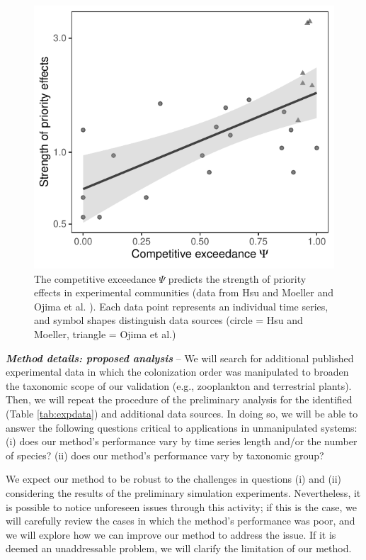 \documentclass[12pt, class=article, crop=false]{standalone}
\begin{document}
\begin{figure}
    \includegraphics[scale=0.7]{output/figure_exp.pdf}
    \caption{The competitive exceedance $\Psi$ predicts the strength of priority effects in experimental communities (data from Hsu and Moeller \citep{hsu_metabolic_2021} and Ojima et al. \citep{ojima_priority_2022}).
    Each data point represents an individual time series, and symbol shapes distinguish data sources (circle = Hsu and Moeller, triangle = Ojima et al.)}
    \label{fig:experiment}
\end{figure}

\textit{\textbf{Method details: proposed analysis}} --
We will search for additional published experimental data in which the colonization order was manipulated to broaden the taxonomic scope of our validation (e.g., zooplankton and terrestrial plants).
Then, we will repeat the procedure of the preliminary analysis for the identified (Table \ref{tab:expdata}) and additional data sources. 
In doing so, we will be able to answer the following questions critical to applications in unmanipulated systems: (i) does our method's performance vary by time series length and/or the number of species? (ii) does our method's performance vary by taxonomic group?

We expect our method to be robust to the challenges in questions (i) and (ii) considering the results of the preliminary simulation experiments.
Nevertheless, it is possible to notice unforeseen issues through this activity; if this is the case, we will carefully review the cases in which the method's performance was poor, and we will explore how we can improve our method to address the issue.
If it is deemed an unaddressable problem, we will clarify the limitation of our method.
\end{document}
